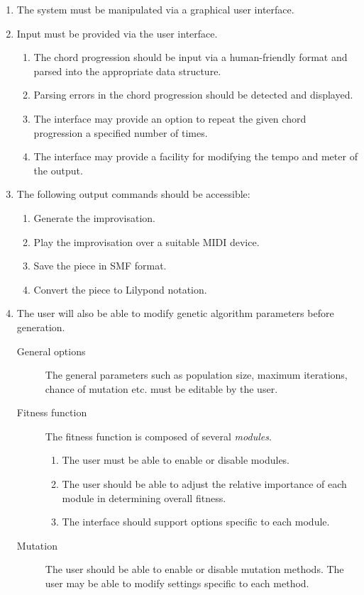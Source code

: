 \begin{enumerate}[resume]
	\item The system must be manipulated via a graphical user interface.
	\item Input must be provided via the user interface.
	\begin{enumerate}
		\item The chord progression should be input via a human-friendly format and parsed into the appropriate data structure.
		\item Parsing errors in the chord progression should be detected and displayed.
		\item The interface may provide an option to repeat the given chord progression a specified number of times.
		\item The interface may provide a facility for modifying the tempo and meter of the output.
	\end{enumerate}
	\item The following output commands should be accessible:
	\begin{enumerate}
		\item Generate the improvisation.
		\item Play the improvisation over a suitable MIDI device.
		\item Save the piece in SMF format.
		\item Convert the piece to Lilypond notation.
	\end{enumerate}
	\item The user will also be able to modify genetic algorithm parameters before generation.
	\begin{description}
		\item[General options] The general parameters such as population size, maximum iterations, chance of mutation etc. must be editable by the user.
		\item[Fitness function] The fitness function is composed of several \emph{modules}.
		\begin{enumerate}
			\item The user must be able to enable or disable modules.
			\item The user should be able to adjust the relative importance of each module in determining overall fitness.
			\item The interface should support options specific to each module.
		\end{enumerate}
		\item[Mutation] The user should be able to enable or disable mutation methods. The user may be able to modify settings specific to each method.

\end{description}
\end{enumerate}
